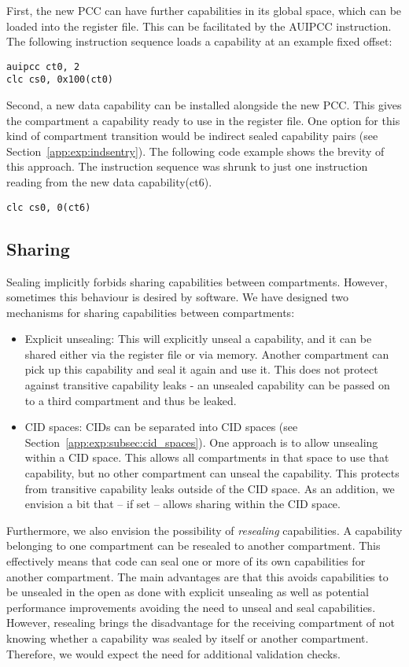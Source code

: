 First, the new PCC can have further capabilities in its global space, which can be loaded into the register file.
This can be facilitated by the AUIPCC instruction.
The following instruction sequence loads a capability at an example fixed offset:

\texttt{auipcc ct0, 2}\\
\texttt{clc cs0, 0x100(ct0)}

Second, a new data capability can be installed alongside the new PCC.
This gives the compartment a capability ready to use in the register file.
One option for this kind of compartment transition would be indirect sealed capability pairs (see Section~\ref{app:exp:indsentry}).
The following code example shows the brevity of this approach.
The instruction sequence was shrunk to just one instruction reading from the new data capability(ct6).

\texttt{clc cs0, 0(ct6)}

\subsection{Sharing}

Sealing implicitly forbids sharing capabilities between compartments.
However, sometimes this behaviour is desired by software. We have designed two mechanisms for sharing capabilities between compartments:

\begin{itemize}
\item Explicit unsealing: This will explicitly unseal a capability, and it can be shared either via the register file or via memory.
Another compartment can pick up this capability and seal it again and use it.
This does not protect against transitive capability leaks - an unsealed capability can be passed on to a third compartment and thus be leaked.
\item CID spaces: CIDs can be separated into CID spaces (see Section~\ref{app:exp:subsec:cid_spaces}).
One approach is to allow unsealing within a CID space.
This allows all compartments in that space to use that capability, but no other compartment can unseal the capability.
This protects from transitive capability leaks outside of the CID space.
As an addition, we envision a bit that -- if set -- allows sharing within the CID space.
\end{itemize}

Furthermore, we also envision the possibility of \textit{resealing} capabilities.
A capability belonging to one compartment can be resealed to another compartment.
This effectively means that code can seal one or more of its own capabilities for another compartment.
The main advantages are that this avoids capabilities to be unsealed in the open as done with explicit unsealing as well as potential performance improvements avoiding the need to unseal and seal capabilities.
However, resealing brings the disadvantage for the receiving compartment of not knowing whether a capability was sealed by itself or another compartment.
Therefore, we would expect the need for additional validation checks.

